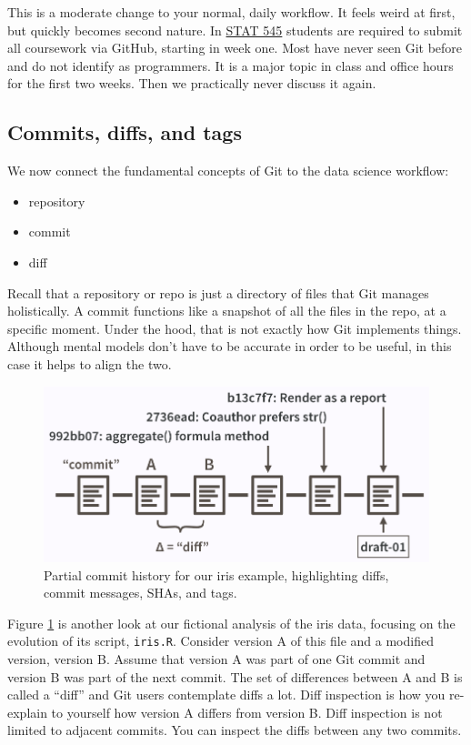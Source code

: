 \documentclass[12pt]{article}
\providecommand{\tightlist}{%
  \setlength{\itemsep}{0pt}\setlength{\parskip}{0pt}}
\begin{document}
This is a moderate change to your normal, daily workflow. It feels weird
at first, but quickly becomes second nature. In
\href{http://stat545.com}{STAT 545} students are required to submit all
coursework via GitHub, starting in week one. Most have never seen Git
before and do not identify as programmers. It is a major topic in class
and office hours for the first two weeks. Then we practically never
discuss it again.

\subsection{Commits, diffs, and tags}\label{commits-diffs-and-tags}

We now connect the fundamental concepts of Git to the data science
workflow:

\begin{itemize}
\tightlist
\item
  repository
\item
  commit
\item
  diff
\end{itemize}

Recall that a repository or repo is just a directory of files that Git
manages holistically. A commit functions like a snapshot of all the
files in the repo, at a specific moment. Under the hood, that is not
exactly how Git implements things. Although mental models don't have to
be accurate in order to be useful, in this case it helps to align the
two.

\begin{figure}
\includegraphics[width=1\linewidth]{commit-diff-sha-tag} \caption{\label{fig:commit-diff-sha-tag}Partial commit history for our iris example, highlighting diffs, commit messages, SHAs, and tags.}\label{fig:commit-diff-sha-tag}
\end{figure}

Figure \ref{fig:commit-diff-sha-tag} is another look at our fictional
analysis of the iris data, focusing on the evolution of its script,
\texttt{iris.R}. Consider version A of this file and a modified version,
version B. Assume that version A was part of one Git commit and version
B was part of the next commit. The set of differences between A and B is
called a ``diff'' and Git users contemplate diffs a lot. Diff inspection
is how you re-explain to yourself how version A differs from version B.
Diff inspection is not limited to adjacent commits. You can inspect the
diffs between any two commits.
\end{document}
